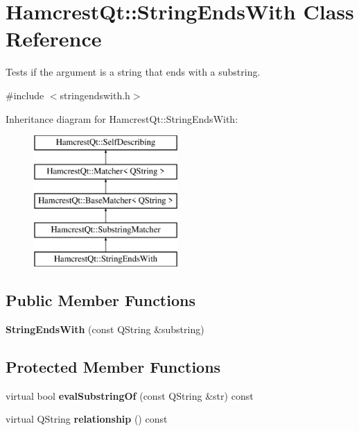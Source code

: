 \hypertarget{class_hamcrest_qt_1_1_string_ends_with}{\section{Hamcrest\-Qt\-:\-:String\-Ends\-With Class Reference}
\label{class_hamcrest_qt_1_1_string_ends_with}
}


Tests if the argument is a string that ends with a substring.  




{\ttfamily \#include $<$stringendswith.\-h$>$}

Inheritance diagram for Hamcrest\-Qt\-:\-:String\-Ends\-With\-:\begin{figure}[H]
\begin{center}
\leavevmode
\includegraphics[height=5.000000cm]{class_hamcrest_qt_1_1_string_ends_with}
\end{center}
\end{figure}
\subsection*{Public Member Functions}
\begin{DoxyCompactItemize}
\item 
\hypertarget{class_hamcrest_qt_1_1_string_ends_with_af01e4ae95d7664b021cc646c0330c5a4}{{\bfseries String\-Ends\-With} (const Q\-String \&substring)}\label{class_hamcrest_qt_1_1_string_ends_with_af01e4ae95d7664b021cc646c0330c5a4}

\end{DoxyCompactItemize}
\subsection*{Protected Member Functions}
\begin{DoxyCompactItemize}
\item 
\hypertarget{class_hamcrest_qt_1_1_string_ends_with_a897370fa94bf442b9626e7bcddee1973}{virtual bool {\bfseries eval\-Substring\-Of} (const Q\-String \&str) const }\label{class_hamcrest_qt_1_1_string_ends_with_a897370fa94bf442b9626e7bcddee1973}

\item 
\hypertarget{class_hamcrest_qt_1_1_string_ends_with_a4a77869c52f296be516f7f1165f2d9cc}{virtual Q\-String {\bfseries relationship} () const }\label{class_hamcrest_qt_1_1_string_ends_with_a4a77869c52f296be516f7f1165f2d9cc}

\end{DoxyCompactItemize}

